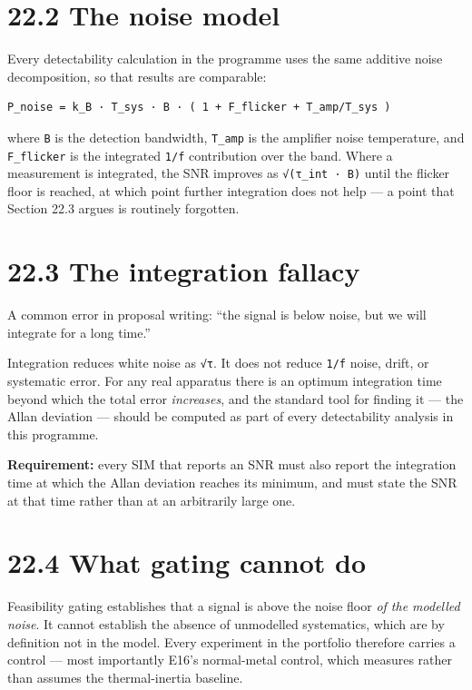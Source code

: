 \documentclass[
  11pt]{report}
\begin{document}
\hypertarget{the-noise-model}{%
\section{22.2 The noise model}\label{the-noise-model}}

Every detectability calculation in the programme uses the same additive
noise decomposition, so that results are comparable:

\begin{verbatim}
P_noise = k_B · T_sys · B · ( 1 + F_flicker + T_amp/T_sys )
\end{verbatim}

where \texttt{B} is the detection bandwidth, \texttt{T\_amp} is the
amplifier noise temperature, and \texttt{F\_flicker} is the integrated
\texttt{1/f} contribution over the band. Where a measurement is
integrated, the SNR improves as \texttt{√(τ\_int\ ·\ B)} until the
flicker floor is reached, at which point further integration does not
help --- a point that Section 22.3 argues is routinely forgotten.

\hypertarget{the-integration-fallacy}{%
\section{22.3 The integration fallacy}\label{the-integration-fallacy}}

A common error in proposal writing: ``the signal is below noise, but we
will integrate for a long time.''

Integration reduces white noise as \texttt{√τ}. It does not reduce
\texttt{1/f} noise, drift, or systematic error. For any real apparatus
there is an optimum integration time beyond which the total error
\emph{increases}, and the standard tool for finding it --- the Allan
deviation --- should be computed as part of every detectability analysis
in this programme.

\textbf{Requirement:} every SIM that reports an SNR must also report the
integration time at which the Allan deviation reaches its minimum, and
must state the SNR at that time rather than at an arbitrarily large one.

\hypertarget{what-gating-cannot-do}{%
\section{22.4 What gating cannot do}\label{what-gating-cannot-do}}

Feasibility gating establishes that a signal is above the noise floor
\emph{of the modelled noise}. It cannot establish the absence of
unmodelled systematics, which are by definition not in the model. Every
experiment in the portfolio therefore carries a control --- most
importantly E16's normal-metal control, which measures rather than
assumes the thermal-inertia baseline.
\end{document}
